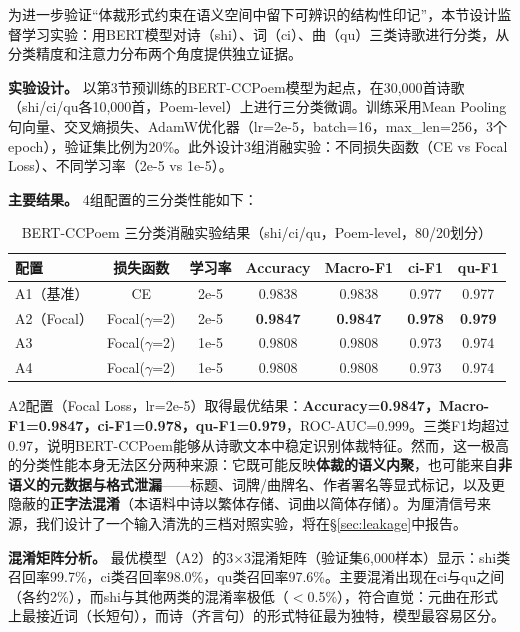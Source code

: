 \documentclass[12pt,a4paper]{article}
\numberwithin{equation}{section}
\begin{document}
为进一步验证“体裁形式约束在语义空间中留下可辨识的结构性印记”，本节设计监督学习实验：用BERT模型对诗（shi）、词（ci）、曲（qu）三类诗歌进行分类，从分类精度和注意力分布两个角度提供独立证据。

\textbf{实验设计。} 以第3节预训练的BERT-CCPoem模型为起点，在30,000首诗歌（shi/ci/qu各10,000首，Poem-level）上进行三分类微调。训练采用Mean Pooling句向量、交叉熵损失、AdamW优化器（lr=2e-5，batch=16，max\_len=256，3个epoch），验证集比例为20\%。此外设计3组消融实验：不同损失函数（CE vs Focal Loss）、不同学习率（2e-5 vs 1e-5）。

\textbf{主要结果。} 4组配置的三分类性能如下：

\begin{table}[htbp]
  \centering
  \caption{BERT-CCPoem 三分类消融实验结果（shi/ci/qu，Poem-level，80/20划分）}
  \label{tab:bert-ablation}
  \begin{tabular}{lcccccc}
    \toprule
    配置         & 损失函数 & 学习率 & Accuracy & Macro-F1 & ci-F1 & qu-F1 \\
    \midrule
    A1（基准）   & CE        & 2e-5 & 0.9838 & 0.9838 & 0.977 & 0.977 \\
    A2（Focal）  & Focal($\gamma$=2) & 2e-5 & \textbf{0.9847} & \textbf{0.9847} & \textbf{0.978} & \textbf{0.979} \\
    A3           & Focal($\gamma$=2) & 1e-5 & 0.9808 & 0.9808 & 0.973 & 0.974 \\
    A4           & Focal($\gamma$=2) & 1e-5 & 0.9808 & 0.9808 & 0.973 & 0.974 \\
    \bottomrule
  \end{tabular}
\end{table}

A2配置（Focal Loss，lr=2e-5）取得最优结果：\textbf{Accuracy=0.9847，Macro-F1=0.9847，ci-F1=0.978，qu-F1=0.979}，ROC-AUC=0.999。三类F1均超过0.97，说明BERT-CCPoem能够从诗歌文本中稳定识别体裁特征。然而，这一极高的分类性能本身无法区分两种来源：它既可能反映\textbf{体裁的语义内聚}，也可能来自\textbf{非语义的元数据与格式泄漏}——标题、词牌/曲牌名、作者署名等显式标记，以及更隐蔽的\textbf{正字法混淆}（本语料中诗以繁体存储、词曲以简体存储）。为厘清信号来源，我们设计了一个输入清洗的三档对照实验，将在\S\ref{sec:leakage}中报告。

\textbf{混淆矩阵分析。} 最优模型（A2）的3×3混淆矩阵（验证集6,000样本）显示：shi类召回率99.7\%，ci类召回率98.0\%，qu类召回率97.6\%。主要混淆出现在ci与qu之间（各约2\%），而shi与其他两类的混淆率极低（$<$0.5\%），符合直觉：元曲在形式上最接近词（长短句），而诗（齐言句）的形式特征最为独特，模型最容易区分。
\end{document}
